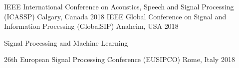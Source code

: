 

\begin{cventries}
            {IEEE International Conference on Acoustics, Speech and Signal Processing (ICASSP)} %
            {Calgary, Canada} %
            {2018} %
            { %
            }
            {IEEE Global Conference on Signal and Information Processing (GlobalSIP)} %
            {Anaheim, USA} %
            {2018} %
            {
                \begin{cvitems} %
                    \item {Signal Processing and Machine Learning}
                    \item {\lorem}
                \end{cvitems}
            }
            {26th European Signal Processing Conference (EUSIPCO)} %
            {Rome, Italy} %
            {2018} %
            { %
            }
\end{cventries}
